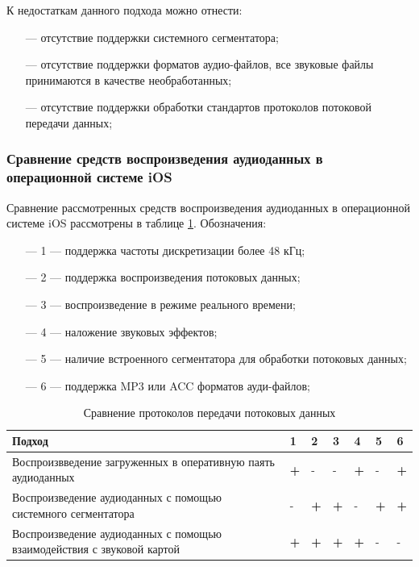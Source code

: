 		\par К недостаткам данного подхода можно отнести:
		\begin{itemize}
			\item[---] отсутствие поддержки системного сегментатора;
			\item[---] отсутствие поддержки форматов аудио-файлов, все звуковые файлы принимаются в качестве необработанных;
			\item[---] отсутствие поддержки обработки стандартов протоколов потоковой передачи данных;
		\end{itemize}
		

	\subsubsection{Сравнение средств воспроизведения аудиоданных в операционной системе iOS}
		Сравнение рассмотренных средств воспроизведения аудиоданных в операционной системе iOS рассмотрены в таблице \ref{tab:ios}. 
		Обозначения:
		\begin{itemize}
			\item[---] 1 --- поддержка частоты дискретизации более 48 кГц;
			\item[---] 2 --- поддержка воспроизведения потоковых данных;
			\item[---] 3 --- воспроизведение в режиме реального времени;
			\item[---] 4 --- наложение звуковых эффектов;
			\item[---] 5 --- наличие встроенного сегментатора для обработки потоковых данных;
			\item[---] 6 --- поддержка MP3 или ACC форматов ауди-файлов; 
		\end{itemize}

		\begin{table}[hbtp]
			\caption{Сравнение протоколов передачи потоковых данных}
			\centering
			\label{tab:ios}
			\begin{tabular}{|p{300pt}|l|l|l|l|l|l|}
				\hline
				\textbf{Подход} & \textbf{1} & \textbf{2} & \textbf{3} & \textbf{4} & \textbf{5} & \textbf{6}  \\ \hline
				Воспроизвведение загруженных в оперативную паять аудиоданных           & \textbf{+} & -          & -          & \textbf{+} & -          & \textbf{+} \\ \hline
				Воспроизведение аудиоданных с помощью системного сегментатора          & -          & \textbf{+} & \textbf{+} & -          & \textbf{+} & \textbf{+} \\ \hline
				Воспроизведение аудиоданных с помощью взаимодействия с звуковой картой & \textbf{+} & \textbf{+} & \textbf{+} & \textbf{+} & -          & -          \\ \hline
			\end{tabular}%
		\end{table}

